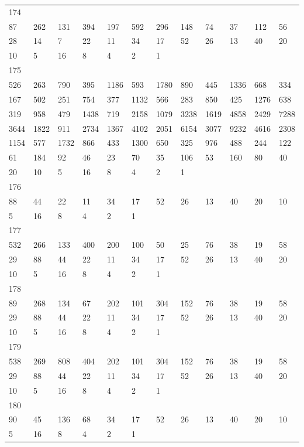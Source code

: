 \begin{longtable}{llllllllllll}
174&&&&&&&&&&&\\
87& 262& 131& 394& 197& 592& 296& 148& 74& 37& 112& 56\\
28& 14& 7& 22& 11& 34& 17& 52& 26& 13& 40& 20\\
10& 5& 16& 8& 4& 2& 1& \\

175&&&&&&&&&&&\\
526& 263& 790& 395& 1186& 593& 1780& 890& 445& 1336& 668& 334\\
167& 502& 251& 754& 377& 1132& 566& 283& 850& 425& 1276& 638\\
319& 958& 479& 1438& 719& 2158& 1079& 3238& 1619& 4858& 2429& 7288\\
3644& 1822& 911& 2734& 1367& 4102& 2051& 6154& 3077& 9232& 4616& 2308\\
1154& 577& 1732& 866& 433& 1300& 650& 325& 976& 488& 244& 122\\
61& 184& 92& 46& 23& 70& 35& 106& 53& 160& 80& 40\\
20& 10& 5& 16& 8& 4& 2& 1& \\

176&&&&&&&&&&&\\
88& 44& 22& 11& 34& 17& 52& 26& 13& 40& 20& 10\\
5& 16& 8& 4& 2& 1& \\

177&&&&&&&&&&&\\
532& 266& 133& 400& 200& 100& 50& 25& 76& 38& 19& 58\\
29& 88& 44& 22& 11& 34& 17& 52& 26& 13& 40& 20\\
10& 5& 16& 8& 4& 2& 1& \\

178&&&&&&&&&&&\\
89& 268& 134& 67& 202& 101& 304& 152& 76& 38& 19& 58\\
29& 88& 44& 22& 11& 34& 17& 52& 26& 13& 40& 20\\
10& 5& 16& 8& 4& 2& 1& \\

179&&&&&&&&&&&\\
538& 269& 808& 404& 202& 101& 304& 152& 76& 38& 19& 58\\
29& 88& 44& 22& 11& 34& 17& 52& 26& 13& 40& 20\\
10& 5& 16& 8& 4& 2& 1& \\

180&&&&&&&&&&&\\
90& 45& 136& 68& 34& 17& 52& 26& 13& 40& 20& 10\\
5& 16& 8& 4& 2& 1& \\


\end{longtable}
